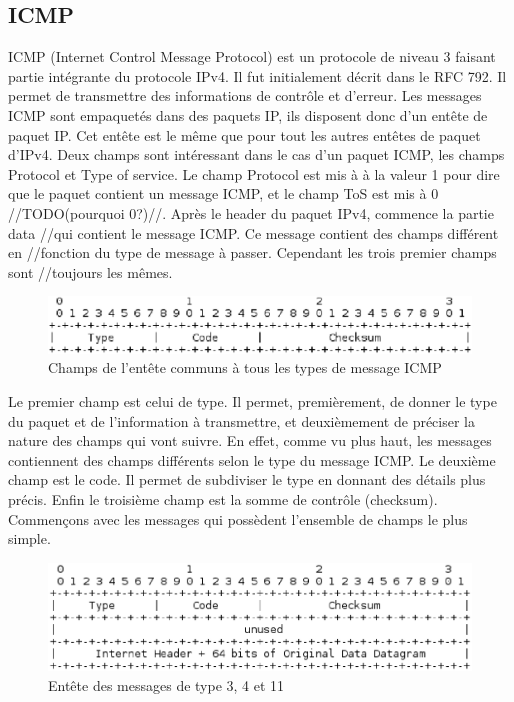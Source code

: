 \subsection{ICMP} ICMP (Internet Control Message Protocol) est un protocole de
niveau 3 faisant partie intégrante du protocole IPv4. Il fut initialement
décrit dans le RFC 792\cite{url-RFC-ICMP}.
Il permet de transmettre des informations de contrôle et d'erreur. Les messages
ICMP sont empaquetés dans des paquets IP, ils disposent donc d'un entête de
paquet IP. Cet entête est le même que pour tout les autres entêtes de paquet
d'IPv4. Deux champs sont intéressant dans le cas d'un paquet ICMP, les champs
Protocol et Type of service. Le champ Protocol est mis à à la valeur 1 pour
dire que le paquet contient un message ICMP, et le champ ToS est mis à 0
//TODO(pourquoi 0?)//.  Après le header du paquet IPv4, commence la partie data
//qui contient le message ICMP. Ce message contient des champs différent en
//fonction du type de message à passer. Cependant les trois premier champs sont
//toujours les mêmes.


\begin{figure}
\centering
\includegraphics[width=15cm]{./pics/header.eps}
\caption{Champs de l'entête communs à tous les types de message ICMP}
\label{fig:headicmp}
\end{figure}

Le premier champ est celui de type. Il permet, premièrement, de donner le type
du paquet et de l'information à transmettre, et deuxièmement de préciser la
nature des champs qui vont suivre. En effet, comme vu plus haut, les messages
contiennent des champs différents selon le type du message ICMP.
Le deuxième champ est le code. Il permet de subdiviser le type en donnant des détails plus
précis. Enfin le troisième champ est la somme de contrôle
(checksum).  Commençons avec les messages qui
possèdent l'ensemble de champs le plus simple.

\begin{figure}
\centering
\includegraphics[width=15cm]{./pics/header1.eps}
\caption{Entête des messages de type 3, 4 et 11}
\label{fig:head1icmp}
\end{figure}

